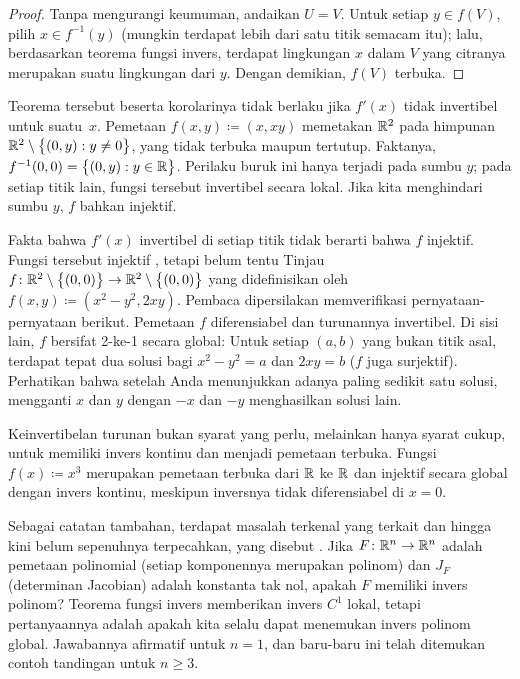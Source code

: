 \begin{proof}
Tanpa mengurangi keumuman, andaikan $U=V$.
Untuk setiap $y \in f(V)$, pilih $x \in f^{-1}(y)$ (mungkin terdapat lebih
dari satu titik semacam itu); lalu, berdasarkan teorema fungsi invers, terdapat
lingkungan $x$ dalam $V$ yang citranya merupakan suatu lingkungan dari $y$.  Dengan demikian,
$f(V)$ terbuka.
\end{proof}

\begin{example}
Teorema tersebut beserta korolarinya tidak berlaku jika $f'(x)$ tidak invertibel untuk
suatu~$x$.
Pemetaan $f(x,y) \coloneqq (x,xy)$ memetakan ${\mathbb{R}}^2$ pada himpunan
${\mathbb{R}}^2 \setminus \bigl\{ (0,y) : y \neq 0 \bigr\}$, yang tidak terbuka maupun tertutup.
Faktanya, $f^{-1}(0,0) = \bigl\{ (0,y) : y \in {\mathbb{R}} \bigr\}$.  Perilaku buruk ini
hanya terjadi pada sumbu $y$; pada setiap titik lain, fungsi tersebut invertibel
secara lokal.  Jika kita menghindari sumbu $y$, $f$ bahkan injektif.
\end{example}

\begin{example}
Fakta bahwa $f'(x)$ invertibel di setiap titik tidak
berarti bahwa $f$
injektif.  Fungsi tersebut injektif , tetapi belum tentu
Tinjau $f \colon {\mathbb{R}}^2 \setminus \bigl\{ (0,0) \bigr\} \to
{\mathbb{R}}^2 \setminus \bigl\{ (0,0) \bigr\}$ yang didefinisikan
oleh $f(x,y) \coloneqq (x^2-y^2,2xy)$.
Pembaca dipersilakan memverifikasi pernyataan-pernyataan berikut.
Pemetaan $f$ diferensiabel dan turunannya invertibel.
Di sisi lain, $f$ bersifat 2-ke-1 secara global: Untuk setiap
$(a,b)$ yang bukan titik asal, terdapat tepat dua
solusi bagi $x^2-y^2=a$ dan $2xy=b$ ($f$ juga surjektif).  Perhatikan bahwa
setelah Anda menunjukkan adanya paling sedikit satu solusi,
mengganti $x$ dan $y$ dengan $-x$ dan $-y$ menghasilkan solusi lain.
\end{example}

Keinvertibelan turunan bukan syarat yang perlu,
melainkan hanya syarat cukup, untuk memiliki invers kontinu dan menjadi pemetaan
terbuka.  Fungsi $f(x) \coloneqq x^3$ merupakan pemetaan terbuka dari ${\mathbb{R}}$
ke ${\mathbb{R}}$ dan injektif secara global dengan invers kontinu, meskipun
inversnya tidak diferensiabel di $x=0$.

\medskip

Sebagai catatan tambahan, terdapat masalah terkenal yang terkait dan hingga kini belum sepenuhnya terpecahkan,
yang disebut \emph{}.  Jika $F \colon {\mathbb{R}}^n \to
{\mathbb{R}}^n$ adalah pemetaan polinomial (setiap komponennya merupakan polinom) dan $J_F$
(determinan Jacobian) adalah konstanta
tak nol, apakah $F$ memiliki invers polinom?
Teorema fungsi invers memberikan invers $C^1$ lokal,
tetapi pertanyaannya adalah apakah kita selalu dapat
menemukan invers polinom global.
Jawabannya afirmatif untuk $n=1$, dan baru-baru ini telah ditemukan contoh tandingan
untuk $n \geq 3$.

